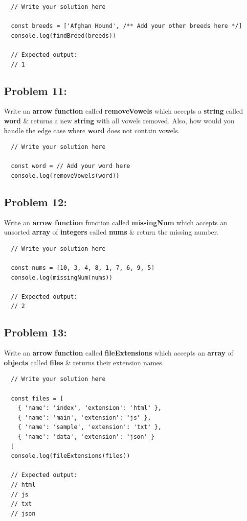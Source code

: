 \documentclass{article}
\begin{document}
\begin{verbatim}
  // Write your solution here

  const breeds = ['Afghan Hound', /** Add your other breeds here */]
  console.log(findBreed(breeds)) 

  // Expected output:
  // 1
\end{verbatim}

\subsection*{Problem 11:} 
Write an \textbf{arrow function} called \textbf{removeVowels} which accepts a \textbf{string} called \textbf{word} \& returns a new \textbf{string} with all vowels removed. Also, how would you handle the edge case where \textbf{word} does not contain vowels.

\begin{verbatim}
  // Write your solution here

  const word = // Add your word here
  console.log(removeVowels(word))
\end{verbatim}

\subsection*{Problem 12:} 
Write an \textbf{arrow function} function called \textbf{missingNum} which accepts an unsorted \textbf{array} of \textbf{integers} called \textbf{nums} \& return the missing number.

\begin{verbatim}
  // Write your solution here

  const nums = [10, 3, 4, 8, 1, 7, 6, 9, 5]
  console.log(missingNum(nums))

  // Expected output:
  // 2
\end{verbatim}

\subsection*{Problem 13:}
Write an \textbf{arrow function} called \textbf{fileExtensions} which accepts an \textbf{array} of \textbf{objects} called \textbf{files} \& returns their extension names.

\begin{verbatim}
  // Write your solution here

  const files = [
    { 'name': 'index', 'extension': 'html' },
    { 'name': 'main', 'extension': 'js' },
    { 'name': 'sample', 'extension': 'txt' },
    { 'name': 'data', 'extension': 'json' }
  ]
  console.log(fileExtensions(files))

  // Expected output:
  // html
  // js
  // txt
  // json
\end{verbatim}
\end{document}
